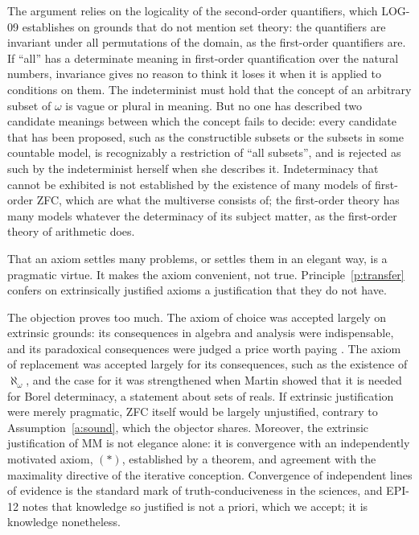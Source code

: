 \documentclass{situationist-preprint}
\begin{document}
\begin{reply}
The argument relies on the logicality of the second-order quantifiers, which LOG-09 establishes on grounds that do not mention set theory: the quantifiers are invariant under all permutations of the domain, as the first-order quantifiers are. If \enquote{all} has a determinate meaning in first-order quantification over the natural numbers, invariance gives no reason to think it loses it when it is applied to conditions on them. The indeterminist must hold that the concept of an arbitrary subset of $\omega$ is vague or plural in meaning. But no one has described two candidate meanings between which the concept fails to decide: every candidate that has been proposed, such as the constructible subsets or the subsets in some countable model, is recognizably a restriction of \enquote{all subsets}, and is rejected as such by the indeterminist herself when she describes it. Indeterminacy that cannot be exhibited is not established by the existence of many models of first-order ZFC, which are what the multiverse consists of; the first-order theory has many models whatever the determinacy of its subject matter, as the first-order theory of arithmetic does.
\end{reply}

\begin{objection}
That an axiom settles many problems, or settles them in an elegant way, is a pragmatic virtue. It makes the axiom convenient, not true. Principle~\ref{p:transfer} confers on extrinsically justified axioms a justification that they do not have.
\end{objection}

\begin{reply}
The objection proves too much. The axiom of choice was accepted largely on extrinsic grounds: its consequences in algebra and analysis were indispensable, and its paradoxical consequences were judged a price worth paying \citep{Maddy1988a}. The axiom of replacement was accepted largely for its consequences, such as the existence of $\aleph_\omega$, and the case for it was strengthened when Martin showed that it is needed for Borel determinacy, a statement about sets of reals. If extrinsic justification were merely pragmatic, ZFC itself would be largely unjustified, contrary to Assumption~\ref{a:sound}, which the objector shares. Moreover, the extrinsic justification of MM is not elegance alone: it is convergence with an independently motivated axiom, $(*)$, established by a theorem, and agreement with the maximality directive of the iterative conception. Convergence of independent lines of evidence is the standard mark of truth-conduciveness in the sciences, and EPI-12 notes that knowledge so justified is not a priori, which we accept; it is knowledge nonetheless.
\end{reply}
\end{document}
